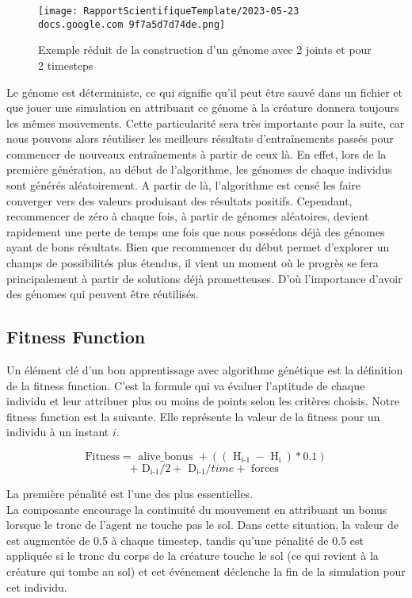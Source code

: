 \documentclass[journal, a4paper]{IEEEtran}
\begin{document}
\begin{figure}[!htb]
  \centering
  \texttt{[image: RapportScientifiqueTemplate/2023-05-23 docs.google.com 9f7a5d7d74de.png]}
  \caption{Exemple réduit de la construction d'un génome avec 2 joints et pour 2 timesteps}
  \label{fig:example}
\end{figure}

Le génome est déterministe, ce qui signifie qu'il peut être sauvé dans un fichier et que jouer une simulation en attribuant ce génome à la créature donnera toujours les mêmes mouvements. Cette particularité sera très importante pour la suite, car nous pouvons alors réutiliser les meilleurs résultats d'entraînements passés pour commencer de nouveaux entraînements à partir de ceux là. En effet, lors de la première génération, au début de l'algorithme, les génomes de chaque individus sont générés aléatoirement. A partir de là, l'algorithme est censé les faire converger vers des valeurs produisant des résultats positifs. Cependant, recommencer de zéro à chaque fois, à partir de génomes aléatoires, devient rapidement une perte de temps une fois que nous possédons déjà des génomes ayant de bons résultats. Bien que recommencer du début permet d'explorer un champs de possibilités plus étendus, il vient un moment où le progrès se fera principalement à partir de solutions déjà prometteuses. D'où l'importance d'avoir des génomes qui peuvent être réutilisés.


\subsection{Fitness Function}

Un élément clé d'un bon apprentissage avec algorithme génétique est la définition de la fitness function. C'est la formule qui va évaluer l'aptitude de chaque individu et leur attribuer plus ou moins de points selon les critères choisis.
Notre fitness function est la suivante. Elle représente la valeur de la fitness pour un individu à un instant $i$.

\begin{equation} 
\text{{Fitness}} = \text{{ alive\_bonus }} + ((\text{{ H}}_\text{i-1 }-\text{{ H}}_\text{i }) * 0.1 )
\end{equation}
\[
  + \text{{ D}}_\text{i-1} / 2 + \text{{ D}}_\text{i-1} / time + \text{{ forces }}
\]

La première pénalité est l'une des plus essentielles. \\
La composante  encourage la continuité du mouvement en attribuant un bonus lorsque le tronc de l'agent ne touche pas le sol. Dans cette situation, la valeur de  est augmentée de 0.5 à chaque timestep, tandis qu'une pénalité de 0.5 est appliquée si le tronc du corps de la créature touche le sol (ce qui revient à la créature qui tombe au sol) et cet événement déclenche la fin de la simulation pour cet individu.
\end{document}
